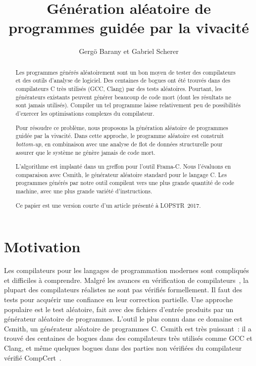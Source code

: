 \documentclass[a4paper]{easychair}
\title{Génération aléatoire de programmes guidée par la vivacité}
\author{Gergö Barany\inst{1} et Gabriel Scherer\inst{2}}
\institute{
Inria Paris \\
\email{gergo.barany@inria.fr}
\and
Inria Saclay \\
\email{gabriel.scherer@gmail.com}
}
\newcommand{\anglais}[1]{\textit{#1}}
\begin{document}
\maketitle
\thispagestyle{plain}

\begin{abstract}
Les programmes générés aléatoirement sont un bon moyen de tester des
compilateurs et des outils d'analyse de logiciel. Des centaines de bogues
ont été trouvés dans des compilateurs C très utilisés (GCC, Clang) par des
tests aléatoires. Pourtant, les générateurs existants peuvent générer
beaucoup de code mort (dont les résultats ne sont jamais utilisés). Compiler
un tel programme laisse relativement peu de possibilités d'exercer les
optimisations complexes du compilateur.

Pour résoudre ce problème, nous proposons la génération aléatoire de
programmes guidée par la vivacité. Dans cette approche, le programme aléatoire
est construit \anglais{bottom-up}, en combinaison avec une analyse de flot de
données structurelle pour assurer que le système ne génère jamais de code
mort.

L'algorithme est implanté dans un greffon pour l'outil Frama-C. Nous
l'évaluons en comparaison avec Csmith, le générateur aléatoire standard pour
le langage C. Les programmes générés par notre outil compilent vers une plus
grande quantité de code machine, avec une plus grande variété
d'instructions.

Ce papier est une version courte d'un article présenté à LOPSTR~2017.
\end{abstract}



\section{Motivation}

Les compilateurs pour les langages de programmation modernes sont
compliqués et difficiles à comprendre. Malgré les avances en vérification de
compilateurs~\cite{leroy-2009,tan-2016}, la plupart des compilateurs
réalistes ne sont pas vérifiés formellement. Il faut des tests pour acquérir une confiance en leur correction partielle. Une approche populaire est le test aléatoire,
fait avec des fichiers d'entrée produits par un générateur aléatoire de
programmes. L'outil le plus connu dans ce domaine est Csmith, un générateur
aléatoire de programmes C. Csmith est très puissant~: il a trouvé des
centaines de bogues dans des compilateurs très utilisés comme GCC et Clang,
et même quelques bogues dans des parties non vérifiées du compilateur vérifié
CompCert~\cite{csmith-2011}.
\end{document}
